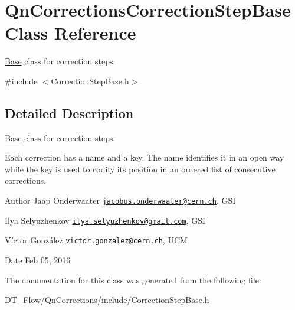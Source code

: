 \hypertarget{classQnCorrectionsCorrectionStepBase}{}\section{Qn\+Corrections\+Correction\+Step\+Base Class Reference}
\label{classQnCorrectionsCorrectionStepBase}


\mbox{\hyperlink{classBase}{Base}} class for correction steps.  




{\ttfamily \#include $<$Correction\+Step\+Base.\+h$>$}



\subsection{Detailed Description}
\mbox{\hyperlink{classBase}{Base}} class for correction steps. 

Each correction has a name and a key. The name identifies it in an open way while the key is used to codify its position in an ordered list of consecutive corrections.

\begin{DoxyAuthor}{Author}
Jaap Onderwaater \href{mailto:jacobus.onderwaater@cern.ch}{\tt jacobus.\+onderwaater@cern.\+ch}, G\+SI 

Ilya Selyuzhenkov \href{mailto:ilya.selyuzhenkov@gmail.com}{\tt ilya.\+selyuzhenkov@gmail.\+com}, G\+SI 

Víctor González \href{mailto:victor.gonzalez@cern.ch}{\tt victor.\+gonzalez@cern.\+ch}, U\+CM 
\end{DoxyAuthor}
\begin{DoxyDate}{Date}
Feb 05, 2016 
\end{DoxyDate}


The documentation for this class was generated from the following file\+:\begin{DoxyCompactItemize}
\item 
D\+T\+\_\+\+Flow/\+Qn\+Corrections/include/Correction\+Step\+Base.\+h\end{DoxyCompactItemize}
